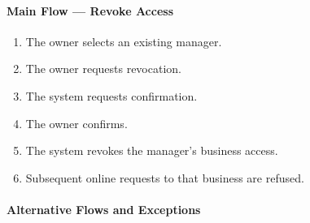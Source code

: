 \paragraph{Main Flow --- Revoke Access}

\begin{enumerate}
        \item The owner selects an existing manager.
        \item The owner requests revocation.
        \item The system requests confirmation.
        \item The owner confirms.
        \item The system revokes the manager's business access.
        \item Subsequent online requests to that business
        are refused.
    \end{enumerate}

\paragraph{Alternative Flows and Exceptions}

